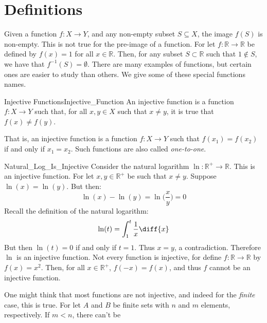 \section{Definitions}
    Given a function $f:X\rightarrow{Y}$, and any non-empty subset
    $S\subseteq{X}$, the image $f(S)$ is non-empty. This is not true for the
    pre-image of a function. For let $f:\mathbb{R}\rightarrow\mathbb{R}$ be
    defined by $f(x)=1$ for all $x\in\mathbb{R}$. Then, for any subset
    $S\subset\mathbb{R}$
    such that $1\notin{S}$, we have that $f^{\minus{1}}(S)=\emptyset$.
    There are many examples of functions, but certain ones are easier
    to study than others. We give some of these special functions names.
    \begin{ldefinition}{Injective Functions}{Injective_Function}
        An \gls{injective function} is a function
        $f:X\rightarrow{Y}$ such that, for all
        $x,y\in{X}$ such that $x\ne{y}$, it is true that
        $f(x)\ne{f}(y)$.
    \end{ldefinition}
    That is, an injective function is a function
    $f:X\rightarrow{Y}$ such that $f(x_{1})=f(x_{2})$
    if and only if $x_{1}=x_{2}$. Such functions are also
    called \textit{one-to-one}.
    \begin{lexample}{}{Natural_Log_Is_Injective}
        Consider the natural logarithm
        $\ln:\mathbb{R}^{+}\rightarrow\mathbb{R}$. This is an injective
        function. For let $x,y\in\mathbb{R}^{+}$ be such that
        $x\ne{y}$. Suppose $\ln(x)=\ln(y)$. But then:
        \begin{equation}
            \ln(x)-\ln(y)=\ln\Big(\frac{x}{y}\Big)=0
        \end{equation}
        Recall the definition of the natural logarithm:
        \begin{equation}
            \ln(t)=\int_{1}^{t}\frac{1}{x}\diff{x}
        \end{equation}
        But then $\ln(t)=0$ if and only if $t=1$. Thus $x=y$, a
        contradiction. Therefore $\ln$ is an injective function. Not
        every function is injective, for define
        $f:\mathbb{R}\rightarrow\mathbb{R}$ by $f(x)=x^{2}$. Then, for
        all $x\in\mathbb{R}^{+}$, $f(\minus{x})=f(x)$, and thus $f$
        cannot be an injective function.
    \end{lexample}
    One might think that most functions are not injective,
    and indeed for the \textit{finite} case, this is true.
    For let $A$ and $B$ be finite sets with $n$ and $m$
    elements, respectively. If $m<n$, there can't be
